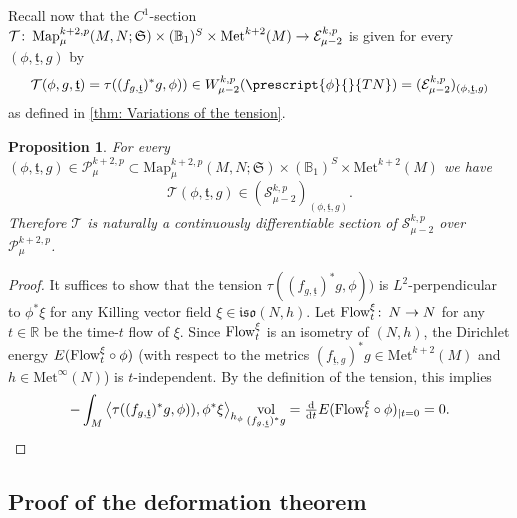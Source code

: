 \documentclass{article}
\numberwithin{equation}{section}        %
\theoremstyle{bfnote}
\newtheorem{prop}[thm]{Proposition}         %
\theoremstyle{definition}
\theoremstyle{bfremark}
\newcommand{\col}{\colon \thinspace}        %
\newcommand{\Map}{\mathrm{Map}}             %
\newcommand{\Met}{\mathrm{Met}}             %
\newcommand{\diff}{\mathrm{d}}                      %
\DeclareMathOperator{\vol}{vol}                 %
\begin{document}
Recall now that the $C^1$-section $\mathcal{T} \col \Map^{k+2,p}_{\mu}(M,N;\mathfrak{S}) \times (\mathbb{B}_1)^S \times \Met^{k+2}(M) \to \mathcal{E}^{k,p}_{\mu-2}$ is given for every $(\phi,\underline{\mathfrak{t}},g)$ by 
\begin{equation*}
    \mathcal{T}(\phi,g,\underline{\mathfrak{t}}) = \tau((f_{g,\underline{\mathfrak{t}}})^*g,\phi)) \in W^{k,p}_{\mu-2}(\prescript{\phi}{}{TN}) = (\mathcal{E}^{k,p}_{\mu-2})_{(\phi,\underline{\mathfrak{t}},g)}  
\end{equation*}
as defined in \cref{thm: Variations of the tension}.

\begin{prop}        \label{prop: tension lies in subbundle}
    For every $(\phi,\underline{\mathfrak{t}},g) \in \mathcal{P}^{k+2,p}_\mu \subset \Map^{k+2,p}_{\mu}(M,N;\mathfrak{S}) \times (\mathbb{B}_1)^S \times \Met^{k+2}(M)$ we have 
    \begin{equation*}
        \mathcal{T}(\phi,\underline{\mathfrak{t}},g) \in (\mathcal{S}^{k,p}_{\mu-2})_{(\phi,\underline{\mathfrak{t}},g)}.
    \end{equation*} 
    Therefore $\mathcal{T}$ is naturally a continuously differentiable section of $\mathcal{S}^{k,p}_{\mu-2}$ over $\mathcal{P}^{k+2,p}_\mu$.
\end{prop}

\begin{proof}
    It suffices to show that the tension $\tau((f_{g,\underline{\mathfrak{t}}})^*g,\phi))$ is $L^2$-perpendicular to $\phi^*\xi$ for any Killing vector field $\xi \in \mathfrak{iso}(N,h)$. Let $\textup{Flow}_t^{\xi} \col N \to N$ for any $t \in \mathbb{R}$ be the time-$t$ flow of $\xi$. Since $\textup{Flow}_t^{\xi}$ is an isometry of $(N,h)$, the Dirichlet energy $E(\textup{Flow}_t^{\xi} \circ \phi)$ (with respect to the metrics $(f_{\underline{\mathfrak{t}},g})^*g \in \Met^{k+2}(M)$ and $h \in \Met^\infty(N)$) is $t$-independent. By the definition of the tension, this implies 
    \begin{equation*}
        - \int_M \big\langle \tau((f_{g,\underline{\mathfrak{t}}})^*g,\phi)), \phi^*\xi \big\rangle_{h_\phi} \vol_{(f_{g,\underline{\mathfrak{t}}})^*g} = \tfrac{\diff}{\diff t} E(\textup{Flow}_t^{\xi} \circ \phi)_{\vert t=0} = 0. \qedhere
    \end{equation*}
\end{proof}

    \subsection{Proof of the deformation theorem}        \label{subsec: the deformation theorem}
\end{document}
